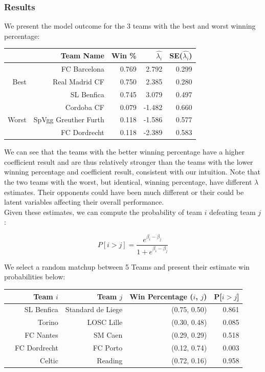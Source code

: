 \documentclass{article}
\begin{document}
\subsubsection{Results}

We present the model outcome for the 3 teams with the best and worst winning percentage:

\begin{table}[H]
\centering
\begin{tabular}{|r|rrrr|}
  \hline
 & Team Name & Win \% & $\hat{\lambda_i}$ & SE($\hat{\lambda_i}$) \\ 
  \hline
   &  FC Barcelona & 0.769 & 2.792 & 0.299 \\ 
 Best  &  Real Madrid CF & 0.750 & 2.385 & 0.280 \\ 
   &  SL Benfica & 0.745 & 3.079 & 0.497 \\ \cline{1-5}
   &  Cordoba CF & 0.079 & -1.482 & 0.660 \\ 
Worst   &  SpVgg Greuther Furth & 0.118 & -1.586  & 0.577 \\ 
   & FC Dordrecht & 0.118 & -2.389 & 0.583 \\
   \hline
\end{tabular}
\end{table}

We can see that the teams with the better winning percentage have a higher coefficient result and are thus relatively stronger than the teams with the lower winning percentage and coefficient result, consistent with our intuition. Note that the two teams with the worst, but identical, winning percentage, have different $\lambda$ estimates. Their opponents could have been much different or their could be latent variables affecting their overall performance. \\

Given these estimates, we can compute the probability of team $i$ defeating team $j$:

$$P[i > j] = \frac{e^{\beta_i - \beta_j}}{1 + e^{\beta_i - \beta_j}}$$

We select a random matchup between 5 Teams and present their estimate win probabilities below:

\begin{table}[H]
\centering
\begin{tabular}{rrrrr}
  \hline
 & Team $i$ & Team $j$ & Win Percentage ($i$, $j$) & P[$i > j$] \\ 
  \hline
 & SL Benfica  & Standard de Liege & (0.75, 0.50) & 0.861 \\ 
   & Torino & LOSC Lille & (0.30, 0.48) & 0.085 \\ 
   & FC Nantes & SM Caen & (0.29, 0.29)  & 0.518 \\ 
   & FC Dordrecht & FC Porto & (0.12, 0.74) & 0.003 \\ 
   & Celtic & Reading & (0.72, 0.16) & 0.958 \\ 
   \hline
\end{tabular}
\end{table}
\end{document}
